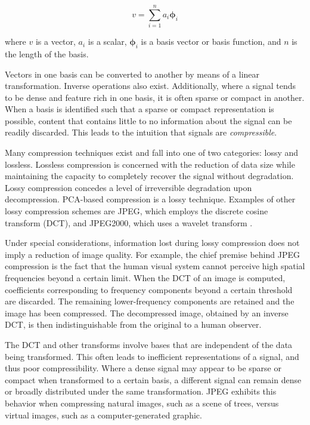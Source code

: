 \documentclass[conference]{IEEEtran}
\begin{document}
    \begin{equation}
        v = \sum_{i=1}^{n} a_i \mathbf{\phi}_{i}
    \label{eq:basisdef}
    \end{equation}

    where $v$ is a vector, $a_i$ is a scalar, $\mathbf{\phi}_{i}$ is a basis vector or basis function, and $n$ is the length of the basis.

    Vectors in one basis can be converted to another by means of a linear transformation. Inverse operations also exist. Additionally, where a signal tends to be dense and feature rich in one basis, it is often sparse or compact in another. When a basis is identified such that a sparse or compact representation is possible, content that contains little to no information about the signal can be readily discarded. This leads to the intuition that signals are \textit{compressible}.

    Many compression techniques exist and fall into one of two categories: lossy and lossless. Lossless compression is concerned with the reduction of data size while maintaining the capacity to  completely recover the signal without degradation. Lossy compression concedes a level of irreversible degradation upon decompression. PCA-based compression is a lossy technique. Examples of other lossy compression schemes are JPEG, which employs the discrete cosine transform (DCT), and JPEG2000, which uses a wavelet transform \cite{jpeg_compression}\cite{jpeg2000_compression}.
    
    Under special considerations, information lost during lossy compression does not imply a reduction of image quality. For example, the chief premise behind JPEG compression is the fact that the human visual system cannot perceive high spatial frequencies beyond a certain limit. When the DCT of an image is computed, coefficients corresponding to frequency components beyond a certain threshold are discarded. The remaining lower-frequency components are retained and the image has been compressed. The decompressed image, obtained by an inverse DCT, is then indistinguishable from the original to a human observer.

    The DCT and other transforms involve bases that are independent of the data being transformed. This often leads to inefficient representations of a signal, and thus poor compressibility. Where a dense signal may appear to be sparse or compact when transformed to a certain basis, a different signal can remain dense or broadly distributed under the same transformation. JPEG exhibits this behavior when compressing natural images, such as a scene of trees, versus virtual images, such as a computer-generated graphic.
    
\end{document}
